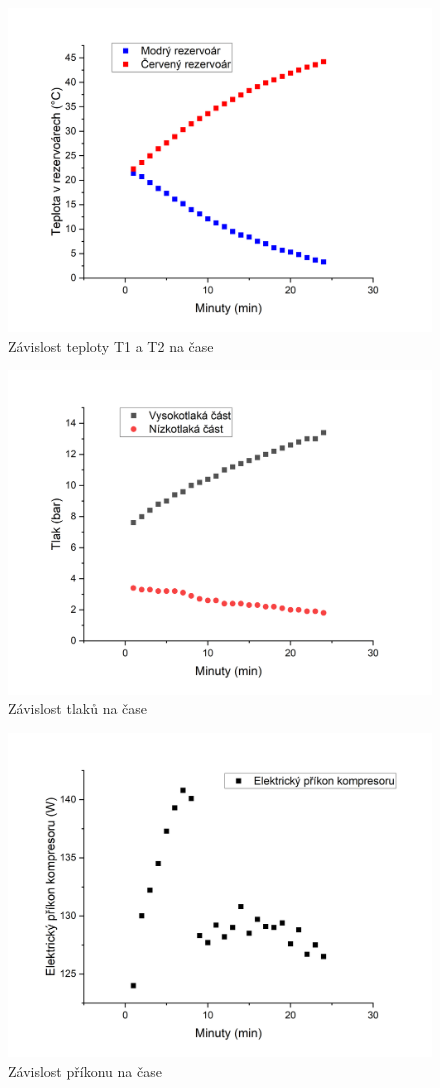 \newpage

\begin{figure}[h]
    \centering
    \includegraphics[width=0.68\linewidth]{27 - Tepelné čerpadlo//Protokol_tepelné čerpadlo//img/T1(t), T2(t) zap.png}
    \caption{Závislost teploty T1 a T2 na čase}
    \label{fig:T1(t),T2(t)}
\end{figure}

\begin{figure}[h]
    \centering
    \includegraphics[width=0.68\linewidth]{27 - Tepelné čerpadlo//Protokol_tepelné čerpadlo//img/P(t) zap.png}
    \caption{Závislost tlaků na čase}
    \label{fig:P(t)}
\end{figure}

\newpage

\begin{figure}[h]
    \centering
    \includegraphics[width=0.68\linewidth]{27 - Tepelné čerpadlo//Protokol_tepelné čerpadlo//img/P0(t).png}
    \caption{Závislost příkonu na čase}
    \label{fig:P0(t)}
\end{figure}

